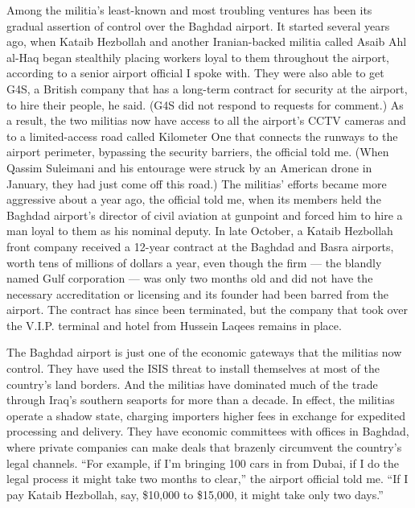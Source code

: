 Among the militia's least-known and most troubling ventures has been its
gradual assertion of control over the Baghdad airport. It started
several years ago, when Kataib Hezbollah and another Iranian-backed
militia called Asaib Ahl al-Haq began stealthily placing workers loyal
to them throughout the airport, according to a senior airport official I
spoke with. They were also able to get G4S, a British company that has a
long-term contract for security at the airport, to hire their people, he
said. (G4S did not respond to requests for comment.) As a result, the
two militias now have access to all the airport's CCTV cameras and to a
limited-access road called Kilometer One that connects the runways to
the airport perimeter, bypassing the security barriers, the official
told me. (When Qassim Suleimani and his entourage were struck by an
American drone in January, they had just come off this road.) The
militias' efforts became more aggressive about a year ago, the official
told me, when its members held the Baghdad airport's director of civil
aviation at gunpoint and forced him to hire a man loyal to them as his
nominal deputy. In late October, a Kataib Hezbollah front company
received a 12-year contract at the Baghdad and Basra airports, worth
tens of millions of dollars a year, even though the firm --- the blandly
named Gulf corporation --- was only two months old and did not have the
necessary accreditation or licensing and its founder had been barred
from the airport. The contract has since been terminated, but the
company that took over the V.I.P. terminal and hotel from Hussein Laqees
remains in place.

The Baghdad airport is just one of the economic gateways that the
militias now control. They have used the ISIS threat to install
themselves at most of the country's land borders. And the militias have
dominated much of the trade through Iraq's southern seaports for more
than a decade. In effect, the militias operate a shadow state, charging
importers higher fees in exchange for expedited processing and delivery.
They have economic committees with offices in Baghdad, where private
companies can make deals that brazenly circumvent the country's legal
channels. ``For example, if I'm bringing 100 cars in from Dubai, if I do
the legal process it might take two months to clear,'' the airport
official told me. ``If I pay Kataib Hezbollah, say, \$10,000 to
\$15,000, it might take only two days.''

